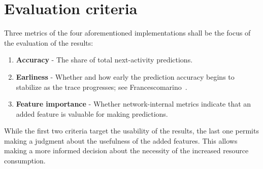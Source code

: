\section{Evaluation criteria}
Three metrics of the four aforementioned implementations shall be the focus of the evaluation of the results:

\begin{enumerate}
    \item\textbf{Accuracy} - The share of total next-activity predictions.
    \item\textbf{Earliness} - Whether and how early the prediction accuracy begins to stabilize as the trace progresses; see Francescomarino~\cite{francescomarino2015}.
    \item\textbf{Feature importance} - Whether network-internal metrics indicate that an added feature is valuable for making predictions.
\end{enumerate}

While the first two criteria target the usability of the results, the last one permits making a judgment about the usefulness of the added features. This allows making a more informed decision about the necessity of the increased resource consumption.